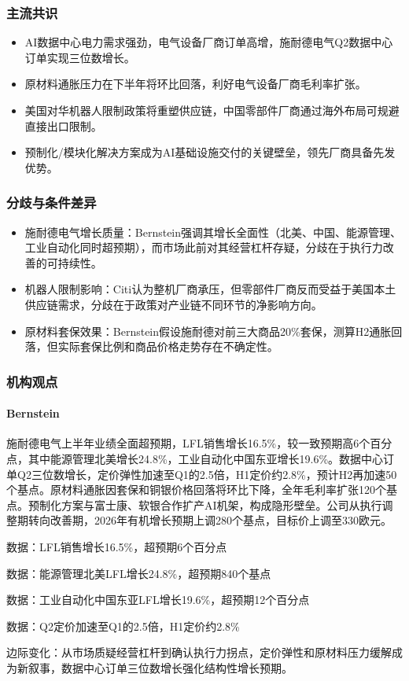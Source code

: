 \documentclass[11pt]{ctexart}
\begin{document}
\subsubsection*{主流共识}
\begin{itemize}
  \item AI数据中心电力需求强劲，电气设备厂商订单高增，施耐德电气Q2数据中心订单实现三位数增长。
  \item 原材料通胀压力在下半年将环比回落，利好电气设备厂商毛利率扩张。
  \item 美国对华机器人限制政策将重塑供应链，中国零部件厂商通过海外布局可规避直接出口限制。
  \item 预制化/模块化解决方案成为AI基础设施交付的关键壁垒，领先厂商具备先发优势。
\end{itemize}
\subsubsection*{分歧与条件差异}
\begin{itemize}
  \item 施耐德电气增长质量：Bernstein强调其增长全面性（北美、中国、能源管理、工业自动化同时超预期），而市场此前对其经营杠杆存疑，分歧在于执行力改善的可持续性。
  \item 机器人限制影响：Citi认为整机厂商承压，但零部件厂商反而受益于美国本土供应链需求，分歧在于政策对产业链不同环节的净影响方向。
  \item 原材料套保效果：Bernstein假设施耐德对前三大商品20\%套保，测算H2通胀回落，但实际套保比例和商品价格走势存在不确定性。
\end{itemize}
\subsubsection*{机构观点}
\paragraph{Bernstein} 施耐德电气上半年业绩全面超预期，LFL销售增长16.5\%，较一致预期高6个百分点，其中能源管理北美增长24.8\%，工业自动化中国东亚增长19.6\%。数据中心订单Q2三位数增长，定价弹性加速至Q1的2.5倍，H1定价约2.8\%，预计H2再加速50个基点。原材料通胀因套保和铜银价格回落将环比下降，全年毛利率扩张120个基点。预制化方案与富士康、软银合作扩产AI机架，构成隐形壁垒。公司从执行调整期转向改善期，2026年有机增长预期上调280个基点，目标价上调至330欧元。
{\small\color{refgray}数据：LFL销售增长16.5\%，超预期6个百分点\par}
{\small\color{refgray}数据：能源管理北美LFL增长24.8\%，超预期840个基点\par}
{\small\color{refgray}数据：工业自动化中国东亚LFL增长19.6\%，超预期12个百分点\par}
{\small\color{refgray}数据：Q2定价加速至Q1的2.5倍，H1定价约2.8\%\par}
{\small\color{refgray}边际变化：从市场质疑经营杠杆到确认执行力拐点，定价弹性和原材料压力缓解成为新叙事，数据中心订单三位数增长强化结构性增长预期。\par}
\end{document}
